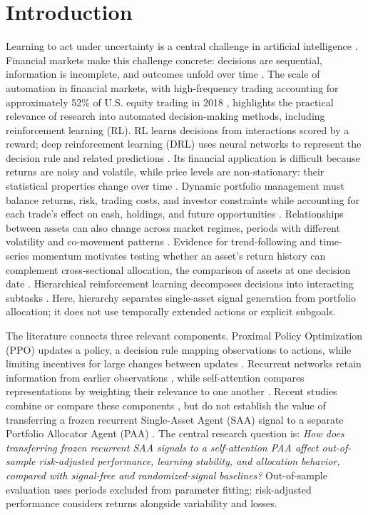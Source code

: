 \section{Introduction}

Learning to act under uncertainty is a central challenge in artificial intelligence \cite{SuttonBarto}. Financial markets make this challenge concrete: decisions are sequential, information is incomplete, and outcomes unfold over time \cite{LopezdePrado.2018}. The scale of automation in financial markets, with high-frequency trading accounting for approximately 52\% of U.S. equity trading in 2018 \cite{Zaharudin2022}, highlights the practical relevance of research into automated decision-making methods, including reinforcement learning (RL). RL learns decisions from interactions scored by a reward; deep reinforcement learning (DRL) uses neural networks to represent the decision rule and related predictions \cite{SuttonBarto,Goodfellow-et-al-2016}. Its financial application is difficult because returns are noisy and volatile, while price levels are non-stationary: their statistical properties change over time \cite{LopezdePrado.2018}. Dynamic portfolio management must balance returns, risk, trading costs, and investor constraints while accounting for each trade's effect on cash, holdings, and future opportunities \cite{Sutiene2024}. Relationships between assets can also change across market regimes, periods with different volatility and co-movement patterns \cite{GabrielNixonRaj.2025}. Evidence for trend-following and time-series momentum motivates testing whether an asset's return history can complement cross-sectional allocation, the comparison of assets at one decision date \cite{Faber2007,Moskowitz2012}. Hierarchical reinforcement learning decomposes decisions into interacting subtasks \cite{Pateria2021}. Here, hierarchy separates single-asset signal generation from portfolio allocation; it does not use temporally extended actions or explicit subgoals.

The literature connects three relevant components. Proximal Policy Optimization (PPO) updates a policy, a decision rule mapping observations to actions, while limiting incentives for large changes between updates \cite{JohnSchulmanFilipWolskiPrafullaDhariwalAlecRadfordOlegKlimov.2017}. Recurrent networks retain information from earlier observations \cite{Hochreiter1997,hausknecht2015deep}, while self-attention compares representations by weighting their relevance to one another \cite{vaswani2017}. Recent studies combine or compare these components \cite{JunKevin.2025,Junfeng.2024,GabrielNixonRaj.2025}, but do not establish the value of transferring a frozen recurrent Single-Asset Agent (SAA) signal to a separate Portfolio Allocator Agent (PAA) \cite{Xue.2026,Coulter2025}. The central research question is: \textit{How does transferring frozen recurrent SAA signals to a self-attention PAA affect out-of-sample risk-adjusted performance, learning stability, and allocation behavior, compared with signal-free and randomized-signal baselines?} Out-of-sample evaluation uses periods excluded from parameter fitting; risk-adjusted performance considers returns alongside variability and losses.


